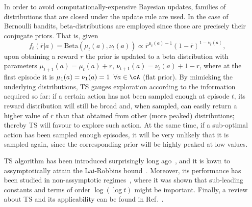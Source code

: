In order to avoid computationally-expensive Bayesian updates, families of distributions that are closed under the update rule are used. In the case of Bernoulli bandits, beta-distributions are employed since those are precisely their conjugate priors. That is, given
\begin{equation}\label{eq:betaDistro}
f_{t}(\bar{r}|a)=\text{Beta}(\mu_t(a), \nu_t(a))\propto \bar{r}^{\mu_{t}(a)-1}(1-\bar{r})^{1-\nu_{t}(a)},
\end{equation}
upon obtaining a reward $r$ the prior is updated to a beta distribution with parameters  $\mu_{t+1}(a)=\mu_{t}(a) + r$, $\nu_{t+1}(a)=\nu_{t}(a) + 1-r$, where at the first episode it is $\mu_{1}(a)=\nu_{1}(a)=1 \;\; \forall a \in \cA$  (flat prior). By mimicking the underlying distributions, TS gauges exploration according to the information acquired so far: if a certain action has not been sampled enough at episode $t$, its reward distribution will still be broad and, when sampled, can easily return a higher value of $\bar r$ than that obtained from other (more peaked) distributions; thereby TS will favour to explore such action. At the same time, if a sub-optimal action has been sampled enough episodes, it will be very unlikely that it is sampled again, since the corresponding prior will be highly peaked at low values. %

TS algorithm has been introduced surprisingly long ago~\cite{Thompson1935}, and it is kown to assymptotically attain the Lai-Robbins bound~\cite{regTS1}. Moreover, its performance has been studied in non-assymptotic regimes~\cite{workTSFOLK}, where it was shown that sub-leading constants and terms of order $\log(\log t)$ might be important. Finally, a review about TS and its applicability can be found in Ref.~\cite{Russo2018}.

